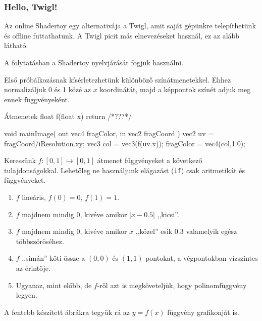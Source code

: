 \subsubsection{Hello, Twigl!}

Az online Shadertoy egy alternativája a Twigl, amit saját gépünkre telepíthetünk és offline futtathatunk.
A Twigl picit más elnevezéseket használ, ez az alább látható.

  
A folytatásban a Shadertoy nyelvjárását fogjuk használni. 

\matfeladatok

Első próbálkozásnak kísérletezhetünk különböző színátmenetekkel. Ehhez normalizáljuk 0 és 1 közé
az $x$ koordinátát, majd a képpontok színét adjuk meg ennek függvényeként.

\begin{glsl}{Átmenetek}
float f(float x) { return /*???*/ }
    
void mainImage( out vec4 fragColor, in vec2 fragCoord )
{
  vec2 uv = fragCoord/iResolution.xy;
  vec3 col = vec3(f(uv.x));
  fragColor = vec4(col,1.0);
}
\end{glsl}

Keressünk $f: [0, 1] \mapsto [0,1]$ átmenet függvényeket a következő tulajdonságokkal.
Lehetőleg ne használjunk elágazást (\texttt{if}) csak aritmetikát és függvényeket.

\begin{enumerate}[resume]
  \item $f$ lineáris, $f(0)=0$, $f(1)=1$.
  \item $f$ majdnem mindig 0, kivéve amikor $|x-0.5|$ ,,kicsi''.
  \item $f$ majdnem mindig 0, kivéve amikor $x$ ,,közel'' esik $0.3$ valamelyik egész többszöröséhez.
  \item $f$ ,,simán'' köti össze a $(0,0)$ és $(1,1)$ pontokat, a végpontokban vízszintes az érintője.
  \item Ugyanaz, mint előbb, de $f$-ről azt is megköveteljük, hogy polinomfüggvény legyen. 
\end{enumerate}

A fentebb készített ábrákra tegyük rá az $y=f(x)$ függvény grafikonját is.


